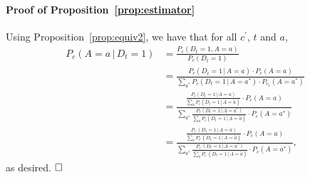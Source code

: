 \documentclass[a4paper]{article}
\newcommand{\given}{\, \vert \,}
\begin{document}
\paragraph{Proof of Proposition~\ref{prop:estimator}}
Using Proposition~\ref{prop:equiv2}, we have that for all $c^\prime$, $t$ and $a$, 
\begin{align*}
P_{c}(A = a \given D_t = 1) &= 
\frac{  
    P_{c}(D_t = 1, A = a)}
  {P_{c}(D_t = 1)}\\
    &= 
\frac{  
    P_{c}(D_t = 1\given A = a)
     \cdot P_{c}(A = a)}
  {\sum_{a^*}  
    P_{c}(D_t = 1\given A = a^*) \cdot P_{c_1}(A = a^*)
    }\\
&= 
\frac{
  \frac{
    P_{c}(D_t = 1\given A = a)}
    {\sum_{\tilde{a}} P_{c}(D_t = 1 \given A = \tilde{a})} \cdot P_{c}(A = a)}
  {\sum_{a^*}  
  \frac{
    P_{c}(D_t = 1\given A = a^*)}
    {\sum_{\tilde{a}} P_{c}(D_t = 1 \given A = \tilde{a})} \cdot P_{c}(A = a^*)} \\
&= 
\frac{
  \frac{
    P_{c^\prime}(D_t = 1\given A = a)}
    {\sum_{\tilde{a}} P_{c^\prime}(D_t = 1 \given A = \tilde{a})} \cdot P_{c}(A = a)}
  {\sum_{a^*}  
  \frac{
    P_{c^\prime}(D_t = 1\given A = a^*)}
    {\sum_{\tilde{a}} P_{c^\prime}(D_t = 1 \given A = \tilde{a})} \cdot P_{c}(A = a^*)},
\end{align*}
as desired. $\hfill \square$


\end{document}
